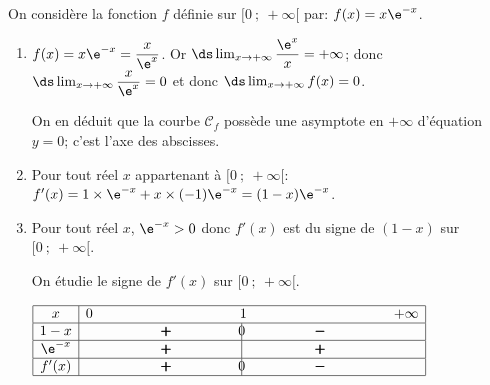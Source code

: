 
\medskip

On considère la fonction $f$ définie sur $[0~;~ +\infty[$ par: $f(x) = x\e^{-x}$.
%
%
%
%

\begin{enumerate}
\item 
$f(x)=x \e^{-x}=\dfrac{x}{\e^{x}}$.
Or $\ds\lim_{x\to +\infty} \dfrac{\e^{x}}{x}=+\infty$; 
donc $\ds\lim_{x\to +\infty} \dfrac{x}{\e^{x}} =0$ et donc  $\ds\lim_{x\to +\infty} f(x)=0$.

On en déduit que la courbe $\mathcal{C}_f$ possède une asymptote en $+ \infty$ d'équation $y=0$; c'est l'axe des abscisses.

\item Pour tout réel $x$ appartenant à $[0~;~ +\infty[$:
$f'(x)=1\times \e^{-x}+x\times (-1)\e^{-x}=(1-x)\e^{-x}$.

\item %

Pour tout réel $x$, $\e^{-x}>0$ donc $f'(x)$ est du signe de $(1-x)$ sur $[0~;~ +\infty[$.

On étudie le signe de $f'(x)$ sur $[0~;~ +\infty[$.

\begin{center}
{\renewcommand{\arraystretch}{1.5}
\def\esp{\hspace*{3cm}}
$\begin{array}{|c | *{5}{c} |} 
\hline
x  & 0 & \esp & 1 & \esp  & +\infty \\
\hline
1-x &  & \pmb{+} &  \vline\hspace{-2.7pt}{0} & \pmb{-} &   \\
\hline
\e^{-x} &  & \pmb{+} &  \vline\hspace{-2.7pt}{\phantom 0} & \pmb{+} &   \\
\hline
f'(x) &  & \pmb{+} &  \vline\hspace{-2.7pt}{0} & \pmb{-} &   \\
\hline
\end{array}$
}
\end{center}


\end{enumerate}
